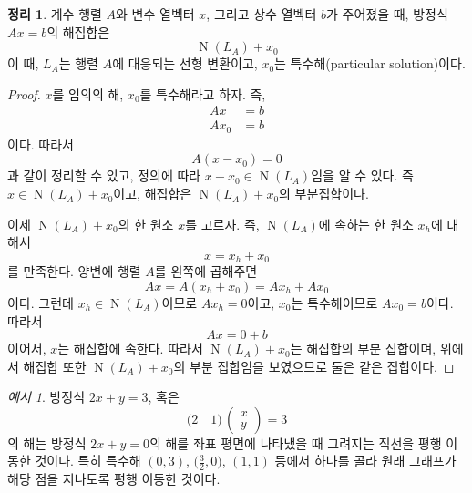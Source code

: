 \documentclass[unfonts,oneside,a4paper]{oblivoir}
\theoremstyle{definition}
\theoremstyle{theorem}
\newtheorem{theorem}{정리}
\theoremstyle{remark}
\theoremstyle{remark}
\theoremstyle{remark}
\newtheorem*{example}{예시}
\theoremstyle{remark}
\renewcommand{\vec}[1]{\bm{\mathit{#1}}}
\newcommand{\vecz}{\bm{\mathrm{0}}}
\DeclareMathOperator{\Null}{N}
\begin{document}
\begin{theorem} \label{thm:nonhomogeneous}
    계수 행렬 $A$와 변수 열벡터 $\vec x$, 그리고 상수 열벡터 $\vec b$가 주어졌을 때, 방정식 $A \vec x = \vec b$의 해집합은
    \begin{equation*}
        \Null(L_A) + \vec x_0
    \end{equation*}
    이 때, $L_A$는 행렬 $A$에 대응되는 선형 변환이고, $\vec x_0$는 특수해(particular solution)이다.
\end{theorem}
\begin{proof}
    $\vec x$를 임의의 해, $\vec x_0$를 특수해라고 하자.
    즉,
    \begin{align*}
        A\vec x &= \vec b\\
        A\vec x_0 &= \vec b
    \end{align*}
    이다.
    따라서
    \begin{equation*}
        A(\vec x - \vec x_0) = 0
    \end{equation*}
    과 같이 정리할 수 있고, 정의에 따라 $\vec x - \vec x_0 \in \Null(L_A)$임을 알 수 있다.
    즉 $\vec x \in \Null(L_A) + \vec x_0$이고, 해집합은 $\Null(L_A) + \vec x_0$의 부분집합이다.

    이제 $\Null(L_A) + \vec x_0$의 한 원소 $\vec x$를 고르자.
    즉, $\Null(L_A)$에 속하는 한 원소 $\vec x_h$에 대해서
    \begin{equation*}
        \vec x = \vec x_h + \vec x_0
    \end{equation*}
    를 만족한다.
    양변에 행렬 $A$를 왼쪽에 곱해주면
    \begin{equation*}
        A \vec x = A (\vec x_h + \vec x_0) = A \vec x_h + A \vec x_0
    \end{equation*}
    이다.
    그런데 $\vec x_h \in \Null(L_A)$이므로 $A \vec x_h = \vecz$이고, $\vec x_0$는 특수해이므로 $A \vec x_0 = \vec b$이다.
    따라서
    \begin{equation*}
        A \vec x = \vecz + \vec b
    \end{equation*}
    이어서, $\vec x$는 해집합에 속한다.
    따라서 $\Null(L_A) + \vec x_0$는 해집합의 부분 집합이며, 위에서 해집합 또한 $\Null(L_A) + \vec x_0$의 부분 집합임을 보였으므로 둘은 같은 집합이다.
\end{proof}

\begin{example}
    방정식 $2x + y = 3$, 혹은
    \begin{equation*}
        \bigl(2 \quad 1\bigr)\,
        \begin{pmatrix}
            x\\
            y
        \end{pmatrix}
        = 3
    \end{equation*}
    의 해는 방정식 $2x + y = 0$의 해를 좌표 평면에 나타냈을 때 그려지는 직선을 평행 이동한 것이다.
    특히 특수해 $(0, 3)$, $\bigl(\frac 32, 0\bigr)$, $(1, 1)$ 등에서 하나를 골라 원래 그래프가 해당 점을 지나도록 평행 이동한 것이다.
\end{example}
\end{document}

